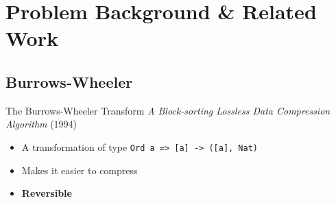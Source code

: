 \documentclass{beamer}
\begin{document}
  \section{Problem Background \& Related Work}

  \subsection{Burrows-Wheeler}

  \tableofcontents[
    sectionstyle=show/shaded,
    subsectionstyle=show/shaded,
    subsubsectionstyle=show/show/hide/hide,
  ]

  \begin{frame}{The Burrows-Wheeler Transform}
    \textit{A Block-sorting Lossless Data Compression Algorithm} (1994)
    \begin{itemize}
    \item<+-> A transformation of type \texttt{Ord a => [a] -> ([a], Nat)}
    \item<+-> Makes it easier to compress
    \item<+-> \textbf{Reversible}
    \end{itemize}
  \end{frame}
\end{document}
